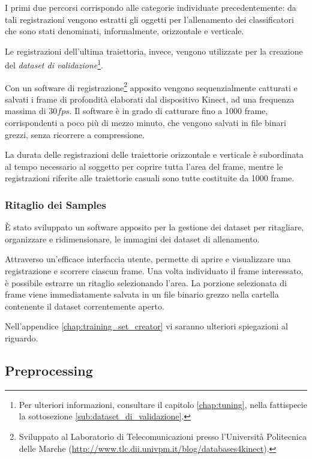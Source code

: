                 I primi due percorsi corrispondo alle categorie individuate precedentemente: da tali registrazioni vengono estratti gli oggetti per l'allenamento dei classificatori che sono stati denominati, informalmente, orizzontale e verticale.

                Le registrazioni dell'ultima traiettoria, invece, vengono utilizzate per la creazione del \emph{dataset di validazione}\footnote{Per ulteriori informazioni, consultare il capitolo \ref{chap:tuning}, nella fattispecie la sottosezione \ref{sub:dataset_di_validazione}.}.

                Con un software di registrazione\footnote{Sviluppato al Laboratorio di Telecomunicazioni presso l'Università Politecnica delle Marche (\url{http://www.tlc.dii.univpm.it/blog/databases4kinect}).} apposito vengono sequenzialmente catturati e salvati i frame di profondità elaborati dal dispositivo Kinect, ad una frequenza massima di $30 fps$.
                Il software è in grado di catturare fino a 1000 frame, corrispondenti a poco più di mezzo minuto, che vengono salvati in file binari grezzi, senza ricorrere a compressione.

                La durata delle registrazioni delle traiettorie orizzontale e verticale è subordinata al tempo necessario al soggetto per coprire tutta l'area del frame, mentre le registrazioni riferite alle traiettorie casuali sono tutte costituite da 1000 frame.

            \subsubsection{Ritaglio dei Samples}
                È stato sviluppato un software apposito per la gestione dei dataset per ritagliare, organizzare e ridimensionare, le immagini dei dataset di allenamento.

                Attraverso un'efficace interfaccia utente, permette di aprire e visualizzare una registrazione e scorrere ciascun frame. 
                Una volta individuato il frame interessato, è possibile estrarre un ritaglio selezionando l'area. 
                La porzione selezionata di frame viene immediatamente salvata in un file binario grezzo nella cartella contenente il dataset correntemente aperto.

                Nell'appendice \ref{chap:training_set_creator} vi saranno ulteriori spiegazioni al riguardo.

        \subsection{Preprocessing}
        \label{sub:preprocessing}
